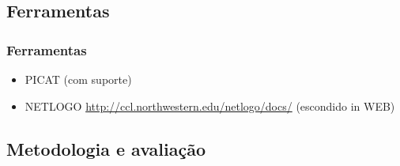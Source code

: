 
\subsection{Ferramentas}
\begin{frame}

    \frametitle{Ferramentas}

    \begin{itemize}
      \item PICAT (com suporte)
      \item NETLOGO
       \url{http://ccl.northwestern.edu/netlogo/docs/} (escondido in WEB)
      
    \end{itemize}
\end{frame}


\subsection{Metodologia e avaliação}  

